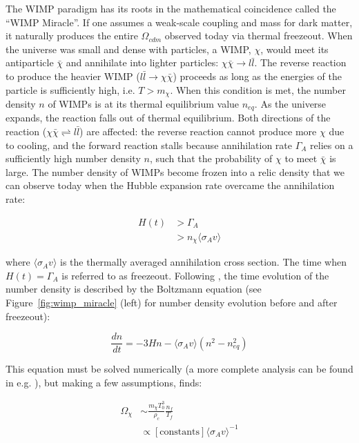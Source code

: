 The \ac{WIMP} paradigm has its roots in the mathematical coincidence called the ``\ac{WIMP} Miracle''. If one assumes a weak-scale coupling and mass for dark matter, it naturally produces the entire $\Omega_{cdm}$ observed today via thermal freezeout. When the universe was small and dense with particles, a \ac{WIMP}, $\chi$, would meet its antiparticle $\bar{\chi}$ and annihilate into lighter particles: $\chi \bar{\chi} \rightarrow l \bar{l}$. The reverse reaction to produce the heavier \ac{WIMP} ($ l \bar{l} \rightarrow \chi \bar{\chi} $) proceeds as long as the energies of the particle is sufficiently high, i.e. $T > m_{\chi}$. When this condition is met, the number density $n$ of \ac{WIMP}s is at its thermal equilibrium value $n_{eq}$. As the universe expands, the reaction falls out of thermal equilibrium. Both directions of the reaction ($\chi \bar{\chi} \rightleftharpoons l \bar{l}$) are affected: the reverse reaction cannot produce more $\chi$ due to cooling, and the forward reaction stalls because annihilation rate $\Gamma_{A}$ relies on a sufficiently high number density $n$, such that the probability of $\chi$ to meet $\bar{\chi}$ is large. The number density of \ac{WIMP}s become frozen into a relic density that we can observe today when the Hubble expansion rate overcame the annihilation rate:

\begin{equation}
\begin{split}
H(t) &> \Gamma_{A} \\
 &> n_{\chi} \langle \sigma_{A} v \rangle
\end{split}
\end{equation}

where $\langle \sigma_{A} v \rangle$ is the thermally averaged annihilation cross section. The time when $H(t) = \Gamma_{A}$ is referred to as freezeout. Following \cite{Feng2010}, the time evolution of the number density is described by the Boltzmann equation (see Figure~\ref{fig:wimp_miracle} (left) for number density evolution before and after freezeout):

\begin{equation}
\frac{dn}{dt} = -3 H n - \langle \sigma_{A}v \rangle (n^{2} - n_{eq}^{2} )
\end{equation}

This equation must be solved numerically (a more complete analysis can be found in e.g. \cite{Lisanti2016}), but making a few assumptions, \cite{Feng2010} finds:

\begin{equation}
\begin{split}
\Omega_{\chi} &\sim \frac{m_{\chi} T_{0}^{3}}{ \rho_{c}} \frac{n_{f}}{T_{f}} \\ %
&\propto [\mathrm{constants}] \langle \sigma_{A}v \rangle^{-1} 
\end{split}
\end{equation}

